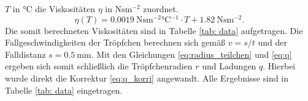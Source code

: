 $T$ in $\si{\celsius}$ die Viskositäten $\eta$ in $\si{\newton\second\meter^{-2}}$ zuordnet.
\begin{equation}
  \eta(T) = \SI{0.0019}{\newton\second\meter^{-2} \celsius^{-1} } \cdot  T  + \SI{1.82}{\newton\second\meter^{-2}}.
\end{equation}
Die somit berechneten Viskositäten sind in Tabelle \ref{tab: data} aufgetragen.
Die Fallgeschwindigkeiten der Tröpfchen berechnen sich gemäß $v = s/t$ und der Falldistanz $s = \SI{0.5}{\milli\meter}$.
Mit den Gleichungen \eqref{eq:radius_teilchen} und \eqref{eq:q} ergeben sich somit schließlich die Tröpfchenradien $r$ und Ladungen $q$. Hierbei wurde
direkt die Korrektur \eqref{eq:q_korri} angewandt. Alle Ergebnisse sind in Tabelle \ref{tab: data} eingetragen. \\


